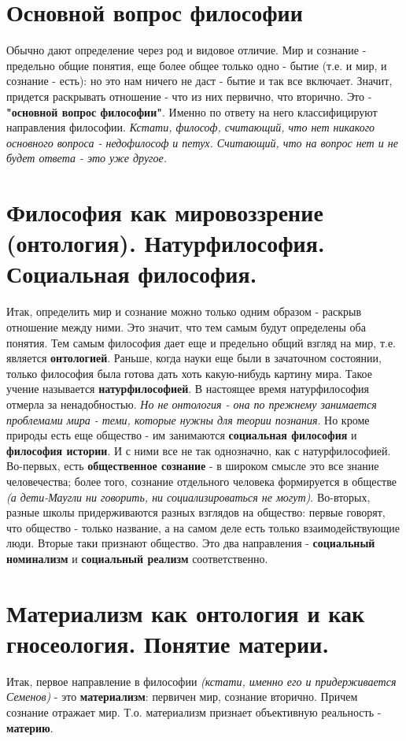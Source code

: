 \documentclass[12pt,a4paper]{article}
\begin{document}
\section{Основной вопрос философии}
Обычно дают определение через род и видовое отличие. Мир и сознание - предельно общие понятия, еще более общее только одно - бытие (т.е. и мир, и сознание - есть): но это нам ничего не даст - бытие и так все включает. Значит, придется раскрывать отношение - что из них первично, что вторично. Это - \textbf{"основной вопрос философии"}. Именно по ответу на него классифицируют направления философии. \textit{Кстати, философ, считающий, что нет никакого основного вопроса - недофилософ и петух. Считающий, что на вопрос нет и не будет ответа - это уже другое.}

\section{Философия как мировоззрение (онтология). Натурфилософия. Социальная философия.}
Итак, определить мир и сознание можно только одним образом - раскрыв отношение между ними. Это значит, что тем самым будут определены оба понятия. Тем самым философия дает еще и предельно общий взгляд на мир, т.е. является \textbf{онтологией}. Раньше, когда науки еще были в зачаточном состоянии, только философия была готова дать хоть какую-нибудь картину мира. Такое учение называется \textbf{натурфилософией}. В настоящее время натурфилософия отмерла за ненадобностью. \textit{Но не онтология - она по прежнему занимается проблемами мира - теми, которые нужны для теории познания}. Но кроме природы есть еще общество - им занимаются \textbf{социальная философия} и \textbf{философия истории}. И с ними все не так однозначно, как с натурфилософией. Во-первых, есть \textbf{общественное сознание} - в широком смысле это все знание человечества; более того, сознание отдельного человека формируется в обществе \textit{(а дети-Маугли ни говорить, ни социализироваться не могут)}. Во-вторых, разные школы придерживаются разных взглядов на общество: первые говорят, что общество - только название, а на самом деле есть только взаимодействующие люди. Вторые таки признают общество. Это два направления - \textbf{социальный номинализм} и \textbf{социальный реализм} соответственно.

\section{Материализм как онтология и как гносеология. Понятие материи.}
Итак, первое направление в философии \textit{(кстати, именно его и придерживается Семенов)} - это \textbf{материализм}: первичен мир, сознание вторично. Причем сознание отражает мир. Т.о. материализм признает объективную реальность - \textbf{материю}. 
\end{document}

